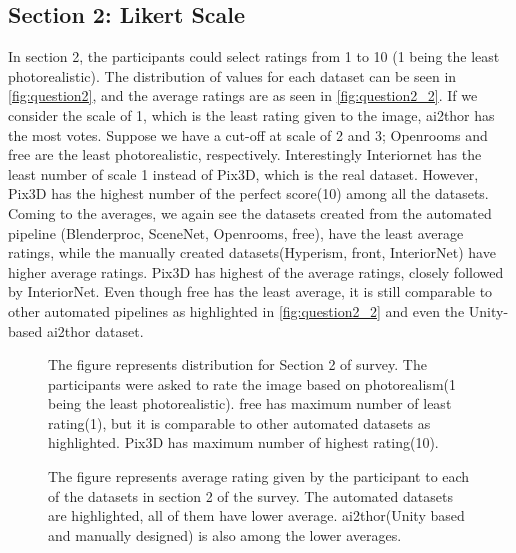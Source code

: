 \subsection{Section 2: Likert Scale}
In section 2, the participants could select ratings from 1 to 10 (1 being the least photorealistic).
The distribution of values for each dataset can be seen in \autoref{fig:question2}, and the average ratings are as seen in \autoref{fig:question2_2}.
If we consider the scale of 1, which is the least rating given to the image, \gls{ai2thor} has the most votes.
Suppose we have a cut-off at scale of 2 and 3; Openrooms and \gls{free} are the least photorealistic, respectively.
Interestingly Interiornet has the least number of scale 1 instead of Pix3D, which is the real dataset.
However, Pix3D has the highest number of the perfect score(10) among all the datasets.
Coming to the averages, we again see the datasets created from the automated pipeline (Blenderproc, SceneNet, Openrooms, \gls{free}), have the least average ratings,
while the manually created datasets(Hyperism, \gls{front}, InteriorNet) have higher average ratings.
Pix3D has highest of the average ratings, closely followed by InteriorNet.
Even though \gls{free} has the least average, it is still comparable to other automated pipelines as highlighted in \autoref{fig:question2_2} and even the Unity-based \gls{ai2thor} dataset.

\begin{figure}
    \centering
    \resizebox{\textwidth}{!}{}
    \caption{The figure represents distribution for Section 2 of survey. The participants were asked to rate the image based on photorealism(1 being the least photorealistic).
    \gls{free} has maximum number of least rating(1), but it is comparable to other automated datasets as highlighted. Pix3D has maximum number of highest rating(10).}
    \label{fig:question2}
\end{figure}

\begin{figure}
    \centering
    \resizebox{0.75\textwidth}{10cm}{}
    \caption{The figure represents average rating given by the participant to each of the datasets in section 2 of the survey.
    The automated datasets are highlighted, all of them have lower average. \gls{ai2thor}(Unity based and manually designed) is also among the lower averages.}
    \label{fig:question2_2}
\end{figure}

